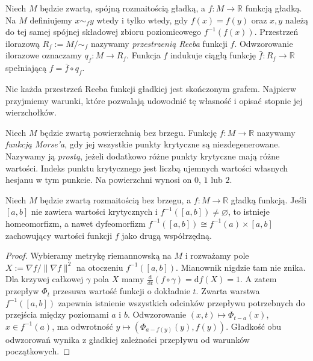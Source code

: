 \begin{definicja}
Niech $M$ będzie zwartą, spójną rozmaitością gładką,
a $f:M\to\mathbb R$ funkcją gładką. Na $M$ definiujemy
$x\sim_f y$ wtedy i tylko wtedy, gdy $f(x)=f(y)$
oraz $x,y$ należą do tej samej spójnej składowej
zbioru poziomicowego $f^{-1}(f(x))$.
Przestrzeń ilorazową $R_f:=M/{\sim_f}$ nazywamy
\emph{przestrzenią Reeba} funkcji $f$. Odwzorowanie
ilorazowe oznaczamy $q_f:M\to R_f$.
Funkcja $f$ indukuje ciągłą funkcję
$\bar f:R_f\to\mathbb R$ spełniającą
$f=\bar f\circ q_f$.
\end{definicja}

Nie każda przestrzeń Reeba funkcji gładkiej jest
skończonym grafem. Najpierw przyjmiemy warunki,
które pozwalają udowodnić tę własność i opisać
stopnie jej wierzchołków.

\begin{definicja}
Niech $M$ będzie zwartą powierzchnią bez brzegu.
Funkcję $f:M\to\mathbb R$ nazywamy \emph{funkcją Morse'a},
gdy jej wszystkie punkty krytyczne są niezdegenerowane.
Nazywamy ją \emph{prostą}, jeżeli dodatkowo różne punkty
krytyczne mają różne wartości. Indeks punktu krytycznego
jest liczbą ujemnych wartości własnych hesjanu w tym punkcie.
Na powierzchni wynosi on $0$, $1$ lub $2$.
\end{definicja}

\begin{stwierdzenie}
Niech $M$ będzie zwartą rozmaitością bez brzegu,
a $f:M\to\mathbb R$ gładką funkcją. Jeśli
$[a,b]$ nie zawiera wartości krytycznych i
$f^{-1}([a,b])\ne\varnothing$, to istnieje
homeomorfizm, a nawet dyfeomorfizm
$f^{-1}([a,b])\cong f^{-1}(a)\times[a,b]$
zachowujący wartości funkcji $f$ jako drugą współrzędną.
\end{stwierdzenie}

\begin{proof}
Wybieramy metrykę riemannowską na $M$ i rozważamy
pole $X:=\nabla f/\|\nabla f\|^2$ na otoczeniu
$f^{-1}([a,b])$. Mianownik nigdzie tam nie znika.
Dla krzywej całkowej $\gamma$ pola $X$ mamy
$\frac{\mathrm d}{\mathrm dt}(f\circ\gamma)
=\mathrm df(X)=1$.
A zatem przepływ $\Phi_t$ przesuwa wartość funkcji
o dokładnie $t$. Zwarta warstwa $f^{-1}([a,b])$
zapewnia istnienie wszystkich odcinków przepływu
potrzebnych do przejścia między poziomami $a$ i $b$.
Odwzorowanie $(x,t)\mapsto\Phi_{t-a}(x)$,
$x\in f^{-1}(a)$, ma odwrotność
$y\mapsto(\Phi_{a-f(y)}(y),f(y))$.
Gładkość obu odwzorowań wynika z gładkiej zależności
przepływu od warunków początkowych.
\end{proof}

